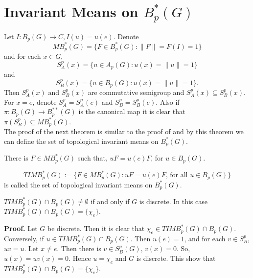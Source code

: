 \section{Invariant Means on $B^*_p(G)$}
Let $I:B_p(G)\longrightarrow C, I(u) = u(e)$. Denote
$$MB^*_p(G) =\{F\in B^*_p(G) : \| F\|= F(I) = 1\}$$
and for each $x\in G$,
$$S^p_A(x) =\{u \in A_p(G) : u(x) = \|u\|= 1\}$$
and
$$S^p_B(x) = \{u \in B_p(G) : u(x) = \|u\|= 1\}.$$
Then $S^p_A(x)$ and $S^p_B(x)$ are commutative semigroup and $S^p_A(x)\subseteq S^p_B(x)$. For $x = e$, denote $S^p_A = S^p_A(e)$ and $S^p_B = S^p_B(e)$. Also if $\pi: B_p(G)\longrightarrow B^{**}_p(G)$ is the canonical map it is clear that $\pi(S^p_B)\subseteq M B^*_p(G)$.\\
\indent
The proof of the next theorem is similar to the proof of \cite[Proposition 4]{6} and
by this theorem we can define the set of topological invariant means on $B^*_p(G)$.
\begin{theorem}
There is $F\in MB^*_p(G)$ such that, $uF = u(e)F$, for $u\in B_p(G)$.
\end{theorem}
\begin{definition}
$$TIMB^*_p(G) :=\{F\in MB^*_p(G) : uF = u(e)F,\, \text{for all $u\in B_p(G)$}\}$$ is called the
set of topological invariant means on $B^*_p(G)$.
\end{definition}
\begin{proposition}
$TIMB^*_p(G) \cap B_p(G)\not=\emptyset$ if and only if $G$ is discrete. In this case $TIMB^*_p(G) \cap B_p(G)=\{\chi_e\}$.
\end{proposition}
{\bf Proof.}
Let $G$ be discrete. Then it is clear that 
$\chi_e \in TIMB^*_p(G)\cap B_p(G)$. Conversely, if $u\in TIMB^*_p(G) \cap B_p(G)$. Then $u(e)=1$, and for each $v\in S^p_B$, $uv=u$. Let
$x\not= e$. Then there is $v\in S^p_B(G)$, $v(x) = 0$. So, $u(x) = uv(x) = 0$. Hence $u = \chi_e$ and $G$ is discrete. This show that $TIMB^*_p(G) \cap B_p(G)=\{\chi_e\}$. \\
 
